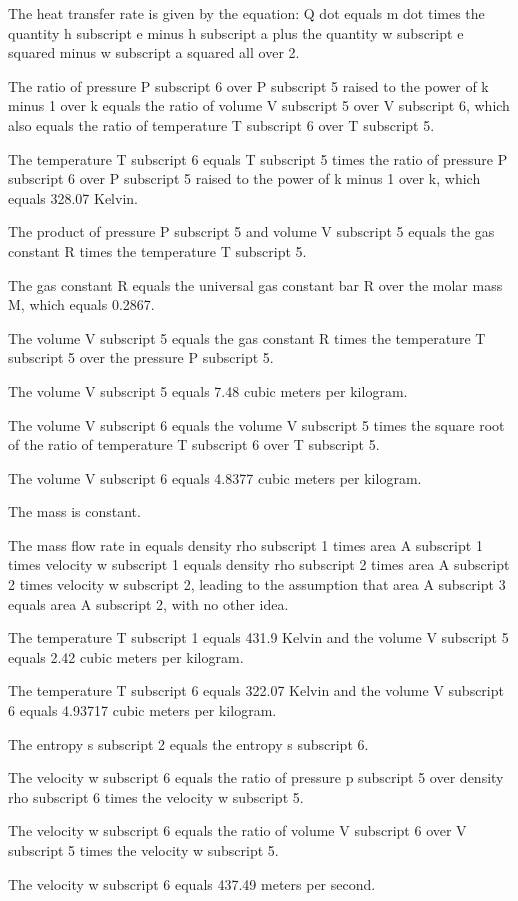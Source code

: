 The heat transfer rate is given by the equation:
Q dot equals m dot times the quantity h subscript e minus h subscript a plus the quantity w subscript e squared minus w subscript a squared all over 2.

The ratio of pressure P subscript 6 over P subscript 5 raised to the power of k minus 1 over k equals the ratio of volume V subscript 5 over V subscript 6, which also equals the ratio of temperature T subscript 6 over T subscript 5.

The temperature T subscript 6 equals T subscript 5 times the ratio of pressure P subscript 6 over P subscript 5 raised to the power of k minus 1 over k, which equals 328.07 Kelvin.

The product of pressure P subscript 5 and volume V subscript 5 equals the gas constant R times the temperature T subscript 5.

The gas constant R equals the universal gas constant bar R over the molar mass M, which equals 0.2867.

The volume V subscript 5 equals the gas constant R times the temperature T subscript 5 over the pressure P subscript 5.

The volume V subscript 5 equals 7.48 cubic meters per kilogram.

The volume V subscript 6 equals the volume V subscript 5 times the square root of the ratio of temperature T subscript 6 over T subscript 5.

The volume V subscript 6 equals 4.8377 cubic meters per kilogram.

The mass is constant.

The mass flow rate in equals density rho subscript 1 times area A subscript 1 times velocity w subscript 1 equals density rho subscript 2 times area A subscript 2 times velocity w subscript 2, leading to the assumption that area A subscript 3 equals area A subscript 2, with no other idea.

The temperature T subscript 1 equals 431.9 Kelvin and the volume V subscript 5 equals 2.42 cubic meters per kilogram.

The temperature T subscript 6 equals 322.07 Kelvin and the volume V subscript 6 equals 4.93717 cubic meters per kilogram.

The entropy s subscript 2 equals the entropy s subscript 6.

The velocity w subscript 6 equals the ratio of pressure p subscript 5 over density rho subscript 6 times the velocity w subscript 5.

The velocity w subscript 6 equals the ratio of volume V subscript 6 over V subscript 5 times the velocity w subscript 5.

The velocity w subscript 6 equals 437.49 meters per second.
